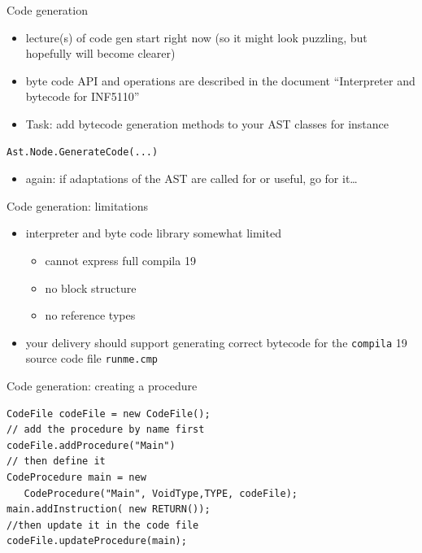 \documentclass{beamer}
\begin{document}
\begin{frame}[label={sec:org5a7eafc},fragile]{Code generation}
 \begin{itemize}
\item lecture(s) of code gen start right now (so it might look puzzling, but
hopefully will become clearer)
\item byte code API and operations are described in the document ``Interpreter
and bytecode for INF5110''

\item \alert{Task:} add bytecode generation methods to your AST classes
for instance
\end{itemize}

\begin{verbatim}
Ast.Node.GenerateCode(...)
\end{verbatim}
\begin{itemize}
\item again: if adaptations of the AST are called for or useful, go for it\ldots{}
\end{itemize}
\end{frame}


\begin{frame}[label={sec:orgc928d1b},fragile]{Code generation: limitations}
 \begin{itemize}
\item interpreter and byte code library somewhat \alert{limited}
\begin{itemize}
\item cannot express full compila 19
\item no block structure
\item no reference types
\end{itemize}
\end{itemize}


\begin{itemize}
\item your delivery should support generating correct bytecode
for the \texttt{compila} 19 source code file \texttt{runme.cmp}
\end{itemize}
\end{frame}



\begin{frame}[label={sec:orgb1b6439},fragile,plain]{Code generation: creating a procedure}
 \lstset{language=java,label= ,caption= ,captionpos=b,numbers=none}
\begin{lstlisting}
CodeFile codeFile = new CodeFile();
// add the procedure by name first
codeFile.addProcedure("Main")
// then define it
CodeProcedure main = new 
   CodeProcedure("Main", VoidType,TYPE, codeFile);
main.addInstruction( new RETURN());
//then update it in the code file
codeFile.updateProcedure(main);
\end{lstlisting}
\end{frame}
\end{document}
